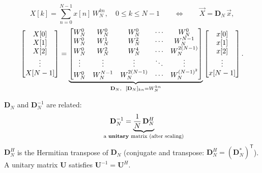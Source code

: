 \documentclass[handout_subfiles_root.tex]{subfiles}
\begin{document}
\maketitle


\begin{equation*}
X[k] = \sum_{n=0}^{N-1} x[n]\,W_N^{kn}, \quad 0\le k\le N-1
\qquad\Longleftrightarrow\qquad
\vec{X} = \mathbf{D}_N\,\vec{x},
\end{equation*}
\begin{equation*}
\begin{bmatrix} X[0] \\ X[1] \\ X[2] \\ \vdots \\ X[N-1] \end{bmatrix}
=
\underbrace{\begin{bmatrix}
W_N^0 & W_N^0 & W_N^0 & \cdots & W_N^0 \\
W_N^0 & W_N^1 & W_N^2 & \cdots & W_N^{N-1} \\
W_N^0 & W_N^2 & W_N^4 & \cdots & W_N^{2(N-1)} \\
\vdots & \vdots & \vdots & \ddots & \vdots \\
W_N^0 & W_N^{N-1} & W_N^{2(N-1)} & \cdots & W_N^{(N-1)^2}
\end{bmatrix}}_{\HandoutUnderbraceLabel{\mathbf{D}_N,\ \ [\mathbf{D}_N]_{kn}=W_N^{kn}}}
\begin{bmatrix} x[0] \\ x[1] \\ x[2] \\ \vdots \\ x[N-1] \end{bmatrix}.
\end{equation*}
\vspace{0.3em}

\begin{factbox}[title={Claim}]
$\mathbf{D}_N$ and $\mathbf{D}_N^{-1}$ are related:
\begin{equation*}
\mathbf{D}_N^{-1} = \underbrace{\frac{1}{N}\,\mathbf{D}_N^{H}}_{\HandoutUnderbraceLabel{\text{a \textbf{unitary} matrix (after scaling)}}}
\end{equation*}
$\mathbf{D}_N^H$ is the Hermitian transpose of $\mathbf{D}_N$ (conjugate and transpose: $\mathbf{D}_N^H = (\mathbf{D}_N^{*})^{\mathsf T}$).
A unitary matrix $\mathbf{U}$ satisfies $\mathbf{U}^{-1} = \mathbf{U}^H$.
\end{factbox}
\end{document}

